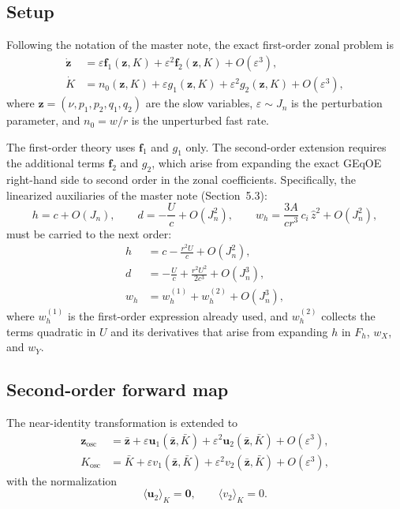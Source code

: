 \documentclass[11pt]{article}
\newcommand{\eps}{\varepsilon}
\newcommand{\mean}[1]{\langle #1 \rangle}
\begin{document}
\subsection{Setup}

Following the notation of the master note, the exact first-order zonal
problem is
\begin{align}
\dot{\bm z} &= \eps \bm f_1(\bm z, K)
             + \eps^2 \bm f_2(\bm z, K)
             + O(\eps^3), \\
\dot K &= n_0(\bm z, K)
        + \eps g_1(\bm z, K)
        + \eps^2 g_2(\bm z, K)
        + O(\eps^3),
\end{align}
where $\bm z = (\nu, p_1, p_2, q_1, q_2)$ are the slow variables,
$\eps \sim J_n$ is the perturbation parameter, and $n_0 = w/r$ is the
unperturbed fast rate.

The first-order theory uses $\bm f_1$ and $g_1$ only. The second-order
extension requires the additional terms $\bm f_2$ and $g_2$, which arise from
expanding the exact GEqOE right-hand side to second order in the zonal
coefficients. Specifically, the linearized auxiliaries of the master note
(Section~5.3):
\begin{equation}
h = c + O(J_n),
\qquad
d = -\frac{U}{c} + O(J_n^2),
\qquad
w_h = \frac{3A}{cr^3}\,c_i\,\hat z^2 + O(J_n^2),
\end{equation}
must be carried to the next order:
\begin{align}
h &= c - \frac{r^2 U}{c} + O(J_n^2),
\label{eq:h_second}\\
d &= -\frac{U}{c} + \frac{r^2 U^2}{2c^3} + O(J_n^3),
\label{eq:d_second}\\
w_h &= w_h^{(1)} + w_h^{(2)} + O(J_n^3),
\label{eq:wh_second}
\end{align}
where $w_h^{(1)}$ is the first-order expression already used, and $w_h^{(2)}$
collects the terms quadratic in $U$ and its derivatives that arise from
expanding $h$ in $F_h$, $w_X$, and $w_Y$.

\subsection{Second-order forward map}

The near-identity transformation is extended to
\begin{align}
\bm z_{\mathrm{osc}}
&= \bar{\bm z}
+ \eps \bm u_1(\bar{\bm z}, \bar K)
+ \eps^2 \bm u_2(\bar{\bm z}, \bar K)
+ O(\eps^3),
\label{eq:forward2_z}\\
K_{\mathrm{osc}}
&= \bar K
+ \eps v_1(\bar{\bm z}, \bar K)
+ \eps^2 v_2(\bar{\bm z}, \bar K)
+ O(\eps^3),
\label{eq:forward2_K}
\end{align}
with the normalization
\begin{equation}
\mean{\bm u_2}_K = \bm 0,
\qquad
\mean{v_2}_K = 0.
\label{eq:zero_mean_2}
\end{equation}
\end{document}
